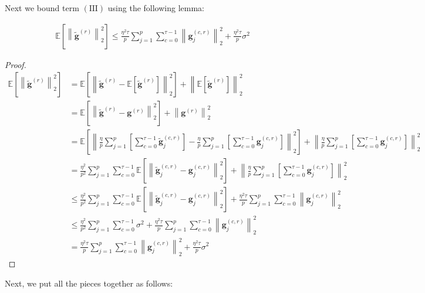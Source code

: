 Next we bound term $(\mathrm{III})$ using the following lemma:
\begin{lemma}
\begin{align}
    \mathbb{E}\left[\left\|\tilde{\mathbf{g}}^{(r)}\right\|_2^2\right]\leq \frac{\eta^2\tau}{p}\sum_{j=1}^{p}\sum_{c=0}^{\tau-1}\left\|\mathbf{g}_j^{(c,r)}\right\|^2_2+\frac{\eta^2\tau}{p}\sigma^2
\end{align}
\end{lemma}
\begin{proof}
\begin{align}
    \mathbb{E}\left[\left\|\tilde{\mathbf{g}}^{(r)}\right\|_2^2\right]&=\mathbb{E}\left[\left\|\tilde{\mathbf{g}}^{(r)}-\mathbb{E}\left[\tilde{\mathbf{g}}^{(r)}\right]\right\|_2^2\right]+\left\|\mathbb{E}\left[\tilde{\mathbf{g}}^{(r)}\right]\right\|^2_2\nonumber\\
    &= \mathbb{E}\left[\left\|\tilde{\mathbf{g}}^{(r)}-{\mathbf{g}}^{(r)}\right\|_2^2\right]+\left\|{\mathbf{g}}^{(r)}\right\|^2_2\nonumber\\
    &= \mathbb{E}\left[\left\|\frac{\eta}{p}\sum_{j=1}^{p}\left[\sum_{c=0}^{\tau-1}\tilde{\mathbf{g}}_j^{(c,r)}\right]-\frac{\eta}{p}\sum_{j=1}^{p}\left[\sum_{c=0}^{\tau-1}\mathbf{g}_j^{(c,r)}\right]\right\|_2^2\right]+\left\|\frac{\eta}{p}\sum_{j=1}^{p}\left[\sum_{c=0}^{\tau-1}\mathbf{g}_j^{(c,r)}\right]\right\|^2_2\nonumber\\
&=\frac{\eta^2}{p^2}\sum_{j=1}^{p}\sum_{c=0}^{\tau-1}\mathbb{E}\left[\left\|\tilde{\mathbf{g}}_j^{(c,r)}-\mathbf{g}_j^{(c,r)}\right\|_2^2\right]+\left\|\frac{\eta}{p}\sum_{j=1}^{p}\left[\sum_{c=0}^{\tau-1}\mathbf{g}_j^{(c,r)}\right]\right\|^2_2 \nonumber\\
&\leq \frac{\eta^2}{p^2}\sum_{j=1}^{p}\sum_{c=0}^{\tau-1}\mathbb{E}\left[\left\|\tilde{\mathbf{g}}_j^{(c,r)}-\mathbf{g}_j^{(c,r)}\right\|_2^2\right]+\frac{\eta^2\tau}{p}\sum_{j=1}^{p}\sum_{c=0}^{\tau-1}\left\|\mathbf{g}_j^{(c,r)}\right\|^2_2\nonumber\\
&\leq \frac{\eta^2}{p^2}\sum_{j=1}^{p}\sum_{c=0}^{\tau-1}\sigma^2+\frac{\eta^2\tau}{p}\sum_{j=1}^{p}\sum_{c=0}^{\tau-1}\left\|\mathbf{g}_j^{(c,r)}\right\|^2_2\nonumber\\
&=\frac{\eta^2\tau}{p}\sum_{j=1}^{p}\sum_{c=0}^{\tau-1}\left\|\mathbf{g}_j^{(c,r)}\right\|^2_2+\frac{\eta^2\tau}{p}\sigma^2
\end{align}
\end{proof}
Next, we put all the pieces together as follows:
